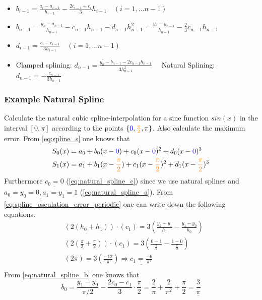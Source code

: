 \begin{itemize}
    \item $b_{i-1}=\frac{a_{i}-a_{i-1}}{h_{i-1}}-\frac{2 c_{i-1}+c_{i}}{3} h_{i-1} \quad(i=1, \ldots n-1)$
    \item $b_{n-1}=\frac{y_{n}-a_{n-1}}{h_{n-1}}-c_{n-1} h_{n-1}-d_{n-1} h_{n-1}^{2}=\frac{y_{n}-y_{n-1}}{h_{n-1}}-\frac{2}{3} c_{n-1} h_{n-1}$
    \item $d_{i-1}=\frac{c_{i}-c_{i-1}}{3 h_{i-1}} \quad(i=1, \ldots n-1)$
    \item Clamped splining: $d_{n-1}=\frac{y_{n}^{\prime}-b_{n-1}-2 c_{n-1} h_{n-1}}{3 h_{n-1}^{2}} \quad$ Natural Splining: $d_{n-1}=-\frac{c_{n-1}}{3 h_{n-1}}$
\end{itemize}
\subsubsection{Example Natural Spline}
Calculate the natural cubic spline-interpolation for a sine function $sin(x)$ in the interval $[0, \pi]$ according to the points $\{\textcolor{blue}{0}, \textcolor{orange}{\frac{\pi}{2}}, \pi\}$. Also calculate the maximum error.\newline
From \autoref{eq:spline_s} one knows that 
$$
\begin{aligned}
   &S_0(x)=a_0+b_0(x-\textcolor{blue}{0})+c_0(x-\textcolor{blue}{0})^2+d_0(x-\textcolor{blue}{0})^3\\
   &S_1(x)=a_1+b_1(x-\textcolor{orange}{\frac{\pi}{2}})+c_1(x-\textcolor{orange}{\frac{\pi}{2}})^2+d_1(x-\textcolor{orange}{\frac{\pi}{2}})^3
\end{aligned}
$$
Furthermore $\underline{c_0=0}$ (\autoref{eq:natural_spline_c}) since we use natural splines and $\underline{a_0=y_0=0, a_1=y_1=1}$ (\autoref{eq:natural_spline_a}). 
From \autoref{eq:spline_osculation_error_periodic} one can write down the following equations:
$$
\begin{aligned}
    &\left(2(h_0+h_1)\right)\cdot\left(c_1\right)=3\left(\frac{y_{2}-y_1}{h_{1}}-\frac{y_1-y_{0}}{h_{0}}\right)\\
    &\left(2\left(\frac{\pi}{2}+\frac{\pi}{2}\right)\right)\cdot\left(c_1\right)=3\left(\frac{0-1}{\frac{\pi}{2}}-\frac{1-0}{\frac{\pi}{2}}\right)\\
    &\left(2\pi \right)=3\left(\frac{-12}{\pi}\right) \Rightarrow \underline{c_1=\frac{-6}{\pi^2}}\\
\end{aligned}
$$
From \autoref{eq:natural_spline_b} one knows that 
$$
b_0=\frac{y_1-y_0}{\pi/2}-\frac{2c_0-c_1}{3}\cdot \frac{\pi}{2}=\frac{2}{\pi}+\frac{2}{\pi^2}+\frac{\pi}{2}=\underline{\frac{3}{\pi}}
$$

